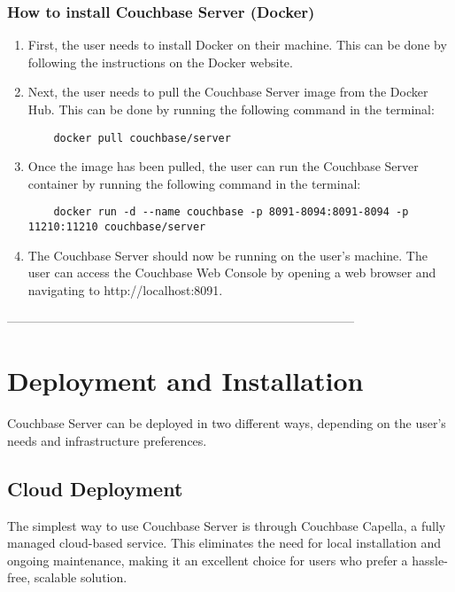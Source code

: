 \subsection{How to install Couchbase Server (Docker)}
\begin{enumerate}
    \item First, the user needs to install Docker on their machine. This can be done by following the instructions on the Docker website.
    \item Next, the user needs to pull the Couchbase Server image from the Docker Hub. This can be done by running the following command in the terminal:
    \begin{verbatim}
    docker pull couchbase/server
    \end{verbatim}
    \item Once the image has been pulled, the user can run the Couchbase Server container by running the following command in the terminal:
    \begin{verbatim}
    docker run -d --name couchbase -p 8091-8094:8091-8094 -p 11210:11210 couchbase/server
    \end{verbatim}
    \item The Couchbase Server should now be running on the user's machine. The user can access the Couchbase Web Console by opening a web browser and navigating to http://localhost:8091.
\end{enumerate}



------------------------------------------------------------------------------------





\chapter{Deployment and Installation}

Couchbase Server can be deployed in two different ways, depending on the user's needs and infrastructure preferences.

\section{Cloud Deployment}
The simplest way to use Couchbase Server is through Couchbase Capella, a fully managed cloud-based service. This eliminates the need for local installation and ongoing maintenance, making it an excellent choice for users who prefer a hassle-free, scalable solution.

